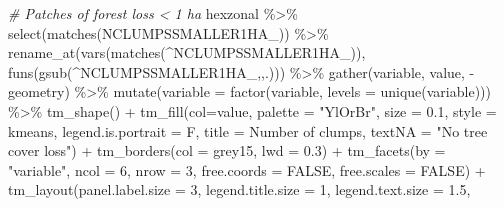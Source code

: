 \documentclass[10pt,landscape,a3paper]{article}
\newenvironment{Shaded}{\begin{snugshade}}{\end{snugshade}}
\newcommand{\AttributeTok}[1]{\textcolor[rgb]{0.77,0.63,0.00}{#1}}
\newcommand{\CommentTok}[1]{\textcolor[rgb]{0.56,0.35,0.01}{\textit{#1}}}
\newcommand{\ConstantTok}[1]{\textcolor[rgb]{0.00,0.00,0.00}{#1}}
\newcommand{\DecValTok}[1]{\textcolor[rgb]{0.00,0.00,0.81}{#1}}
\newcommand{\FloatTok}[1]{\textcolor[rgb]{0.00,0.00,0.81}{#1}}
\newcommand{\FunctionTok}[1]{\textcolor[rgb]{0.00,0.00,0.00}{#1}}
\newcommand{\NormalTok}[1]{#1}
\newcommand{\SpecialCharTok}[1]{\textcolor[rgb]{0.00,0.00,0.00}{#1}}
\newcommand{\StringTok}[1]{\textcolor[rgb]{0.31,0.60,0.02}{#1}}
\begin{document}
\begin{Shaded}
\begin{Highlighting}[]

\CommentTok{\# Patches of forest loss \textless{} 1 ha}
\NormalTok{hexzonal }\SpecialCharTok{\%\textgreater{}\%} \FunctionTok{select}\NormalTok{(}\FunctionTok{matches}\NormalTok{(}\StringTok{\textquotesingle{}NCLUMPSSMALLER1HA\_\textquotesingle{}}\NormalTok{)) }\SpecialCharTok{\%\textgreater{}\%} 
  \FunctionTok{rename\_at}\NormalTok{(}\FunctionTok{vars}\NormalTok{(}\FunctionTok{matches}\NormalTok{(}\StringTok{\textquotesingle{}\^{}NCLUMPSSMALLER1HA\_\textquotesingle{}}\NormalTok{)), }\FunctionTok{funs}\NormalTok{(}\FunctionTok{gsub}\NormalTok{(}\StringTok{\textquotesingle{}\^{}NCLUMPSSMALLER1HA\_\textquotesingle{}}\NormalTok{,}\StringTok{\textquotesingle{}\textquotesingle{}}\NormalTok{,.))) }\SpecialCharTok{\%\textgreater{}\%} 
  \FunctionTok{gather}\NormalTok{(variable, value, }\SpecialCharTok{{-}}\NormalTok{geometry) }\SpecialCharTok{\%\textgreater{}\%}
  \FunctionTok{mutate}\NormalTok{(}\AttributeTok{variable =} \FunctionTok{factor}\NormalTok{(variable, }\AttributeTok{levels =} \FunctionTok{unique}\NormalTok{(variable))) }\SpecialCharTok{\%\textgreater{}\%} 
  \FunctionTok{tm\_shape}\NormalTok{() }\SpecialCharTok{+}
  \FunctionTok{tm\_fill}\NormalTok{(}\AttributeTok{col=}\StringTok{\textquotesingle{}value\textquotesingle{}}\NormalTok{, }\AttributeTok{palette =} \StringTok{"YlOrBr"}\NormalTok{, }\AttributeTok{size =} \FloatTok{0.1}\NormalTok{,}
          \AttributeTok{style =} \StringTok{\textquotesingle{}kmeans\textquotesingle{}}\NormalTok{, }\AttributeTok{legend.is.portrait =}\NormalTok{ F, }\AttributeTok{title =} \StringTok{\textquotesingle{}Number of clumps\textquotesingle{}}\NormalTok{,}
          \AttributeTok{textNA =} \StringTok{"No tree cover loss"}\NormalTok{) }\SpecialCharTok{+}
  \FunctionTok{tm\_borders}\NormalTok{(}\AttributeTok{col =} \StringTok{\textquotesingle{}grey15\textquotesingle{}}\NormalTok{, }\AttributeTok{lwd =} \FloatTok{0.3}\NormalTok{) }\SpecialCharTok{+}
  \FunctionTok{tm\_facets}\NormalTok{(}\AttributeTok{by =} \StringTok{"variable"}\NormalTok{, }\AttributeTok{ncol =} \DecValTok{6}\NormalTok{, }\AttributeTok{nrow =} \DecValTok{3}\NormalTok{, }\AttributeTok{free.coords =} \ConstantTok{FALSE}\NormalTok{, }\AttributeTok{free.scales =} \ConstantTok{FALSE}\NormalTok{) }\SpecialCharTok{+}
  \FunctionTok{tm\_layout}\NormalTok{(}\AttributeTok{panel.label.size =} \DecValTok{3}\NormalTok{, }\AttributeTok{legend.title.size =} \DecValTok{1}\NormalTok{, }\AttributeTok{legend.text.size =} \FloatTok{1.5}\NormalTok{,}

\end{Highlighting}
\end{Shaded}
\end{document}
